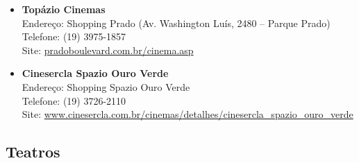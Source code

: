 \begin{itemize}
    \item   \textbf{Topázio Cinemas}
        \\Endereço: Shopping Prado (Av. Washington Luís, 2480 -- Parque Prado)
        \\Telefone: (19) 3975-1857
        \\Site: \url{pradoboulevard.com.br/cinema.asp}

    \item   \textbf{Cinesercla Spazio Ouro Verde}
        \\Endereço: Shopping Spazio Ouro Verde
        \\Telefone: (19) 3726-2110
        \\Site:
      \url{www.cinesercla.com.br/cinemas/detalhes/cinesercla_spazio_ouro_verde}

\end{itemize}

\subsection{Teatros}

